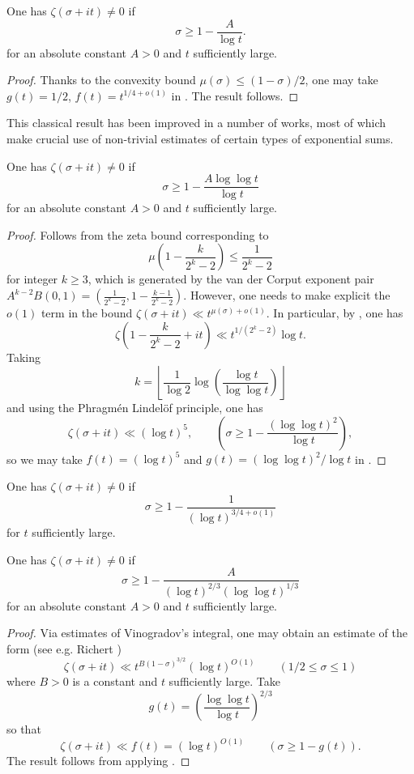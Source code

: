 \begin{theorem}\label{zfr-classical}
One has $\zeta(\sigma + it) \ne 0$ if 
\[
\sigma \ge 1 - \frac{A}{\log t}.
\]
for an absolute constant $A > 0$ and $t$ sufficiently large.
\end{theorem}
\begin{proof}
Thanks to the convexity bound $\mu(\sigma) \le (1-\sigma)/2$, one may take $g(t) = 1/2$, $f(t) = t^{1/4 + o(1)}$ in . The result follows.
\end{proof}

This classical result has been improved in a number of works, most of which make crucial use of non-trivial estimates of certain types of exponential sums.

\begin{theorem}\label{zfr-littlewood}
One has $\zeta(\sigma + it) \ne 0$ if 
\[
\sigma \ge 1 - \frac{A \log\log t}{\log t}
\]
for an absolute constant $A > 0$ and $t$ sufficiently large.
\end{theorem}
\begin{proof}
Follows from the zeta bound corresponding to
\[
\mu\left(1 - \frac{k}{2^k - 2}\right) \le \frac{1}{2^k - 2}
\]
for integer $k\ge 3$, which is generated by the van der Corput exponent pair $A^{k - 2}B(0, 1) = (\frac{1}{2^k - 2}, 1 - \frac{k - 1}{2^k - 2})$. However, one needs to make explicit the $o(1)$ term in the bound $\zeta(\sigma + it) \ll t^{\mu(\sigma) + o(1)}$. In particular, by \cite[Theorem 5.14]{titchmarsh_theory_1986}, one has 
\[
\zeta(1 - \frac{k}{2^k - 2} + it) \ll t^{1/(2^k - 2)}\log t.
\]
Taking 
\[
k = \left\lfloor \frac{1}{\log 2}\log\left(\frac{\log t}{\log\log t}\right)\right\rfloor
\]
and using the Phragm\'en Lindel\"of principle, one has 
\[
\zeta(\sigma + it) \ll (\log t)^5,\qquad (\sigma \ge 1 - \frac{(\log\log t)^2}{\log t}),
\]
so we may take $f(t) = (\log t)^5$ and $g(t) = (\log\log t)^2/\log t$ in .
\end{proof}

\begin{theorem}\label{zfr-chudakov}
One has $\zeta(\sigma + it) \ne 0$ if 
\[
\sigma \ge 1 - \frac{1}{(\log t)^{3/4 + o(1)}}
\]
for $t$ sufficiently large.
\end{theorem}

\begin{theorem}\label{zfr-vk}
One has $\zeta(\sigma + it) \ne 0$ if 
\[
\sigma \ge 1 - \frac{A}{(\log t)^{2/3}(\log\log t)^{1/3}}
\]
for an absolute constant $A > 0$ and $t$ sufficiently large.
\end{theorem}
\begin{proof}
Via estimates of Vinogradov's integral, one may obtain an estimate of the form (see e.g. Richert \cite{richert_zur_1967})
\[
\zeta(\sigma + it) \ll t^{B(1 - \sigma)^{3/2}}(\log t)^{O(1)}\qquad (1/2 \le \sigma \le 1)
\]
where $B > 0$ is a constant and $t$ sufficiently large. Take 
\[
g(t) = \left(\frac{\log\log t}{\log t}\right)^{2/3}
\]
so that
\[
\zeta(\sigma + it) \ll f(t) = (\log t)^{O(1)}\qquad (\sigma \ge 1 - g(t)).
\]
The result follows from applying .
\end{proof}


